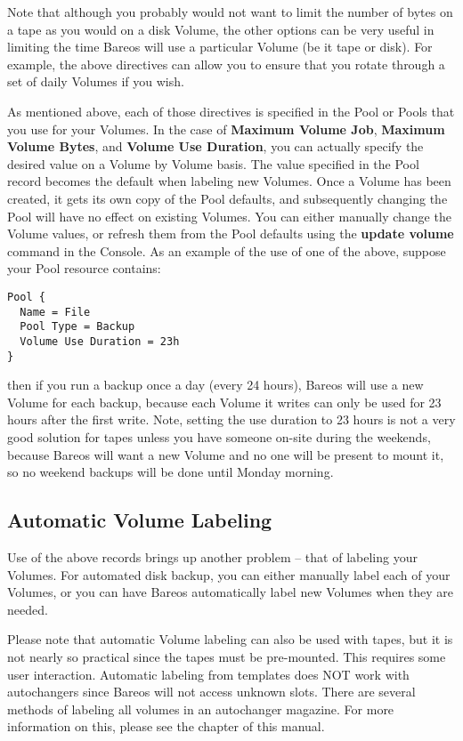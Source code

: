 Note that although you probably would not want to limit the number of bytes on
a tape as you would on a disk Volume, the other options can be very useful in
limiting the time Bareos will use a particular Volume (be it tape or disk).
For example, the above directives can allow you to ensure that you rotate
through a set of daily Volumes if you wish.

As mentioned above, each of those directives is specified in the Pool or
Pools that you use for your Volumes. In the case of {\bf Maximum Volume Job},
{\bf Maximum Volume Bytes}, and {\bf Volume Use Duration}, you can actually
specify the desired value on a Volume by Volume basis. The value specified in
the Pool record becomes the default when labeling new Volumes. Once a Volume
has been created, it gets its own copy of the Pool defaults, and subsequently
changing the Pool will have no effect on existing Volumes. You can either
manually change the Volume values, or refresh them from the Pool defaults using
the {\bf update volume} command in the Console. As an example
of the use of one of the above, suppose your Pool resource contains:

\footnotesize
\begin{verbatim}
Pool {
  Name = File
  Pool Type = Backup
  Volume Use Duration = 23h
}
\end{verbatim}
\normalsize

then if you run a backup once a day (every 24 hours), Bareos will use a new
Volume for each backup, because each Volume it writes can only be used for 23 hours
after the first write. Note, setting the use duration to 23 hours is not a very
good solution for tapes unless you have someone on-site during the weekends,
because Bareos will want a new Volume and no one will be present to mount it,
so no weekend backups will be done until Monday morning.

\label{AutomaticLabeling}
\subsection{Automatic Volume Labeling}

Use of the above records brings up another problem -- that of labeling your
Volumes. For automated disk backup, you can either manually label each of your
Volumes, or you can have Bareos automatically label new Volumes when they are
needed.

Please note that automatic Volume labeling can also be used with tapes, but
it is not nearly so practical since the tapes must be pre-mounted.  This
requires some user interaction.  Automatic labeling from templates does NOT
work with autochangers since Bareos will not access unknown slots.  There
are several methods of labeling all volumes in an autochanger magazine.
For more information on this, please see the  chapter of this manual.

